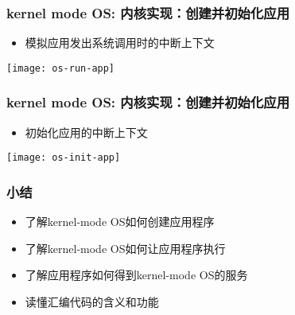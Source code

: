 \begin{frame}
    \frametitle{kernel mode OS: 内核实现：创建并初始化应用}

    \begin{itemize}
        \item 模拟应用发出系统调用时的中断上下文
    \end{itemize}	
    \centering
    \texttt{[image: os-run-app]}
\end{frame}

\begin{frame}
    \frametitle{kernel mode OS: 内核实现：创建并初始化应用}
    
    \begin{itemize}
        \item 初始化应用的中断上下文
    \end{itemize}	
    \centering
    \texttt{[image: os-init-app]}
\end{frame}
\begin{frame}
    \frametitle{小结}
    \begin{itemize}
        \item 了解kernel-mode OS如何创建应用程序
        \item 了解kernel-mode OS如何让应用程序执行
        \item 了解应用程序如何得到kernel-mode OS的服务
        \item 读懂汇编代码的含义和功能
    \end{itemize}
\end{frame}
%
%
